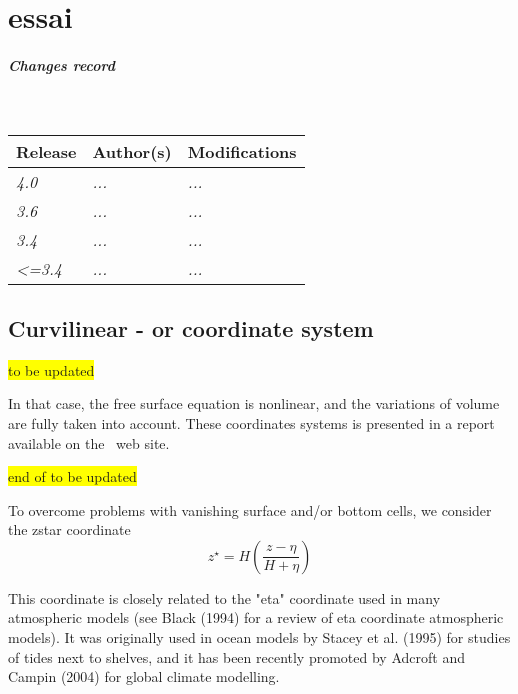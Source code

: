 \documentclass[../main/NEMO_manual]{subfiles}
\begin{document}
\chapter{ essai \zstar \sstar}

\thispagestyle{plain}

\chaptertoc

\paragraph{Changes record} ~\\

{\footnotesize
  \begin{tabularx}{\textwidth}{l||X|X}
    Release & Author(s) & Modifications \\
    \hline
    {\em   4.0} & {\em ...} & {\em ...} \\
    {\em   3.6} & {\em ...} & {\em ...} \\
    {\em   3.4} & {\em ...} & {\em ...} \\
    {\em <=3.4} & {\em ...} & {\em ...}
  \end{tabularx}
}

\clearpage

\section{Curvilinear \zstar- or \sstar coordinate system}

\colorbox{yellow}{ to be updated }

In that case, the free surface equation is nonlinear, and the variations of volume are fully taken into account.
These coordinates systems is presented in a report \citep{levier.treguier.ea_rpt07} available on the \NEMO\ web site.

\colorbox{yellow}{  end of to be updated}


To overcome problems with vanishing surface and/or bottom cells, we consider the zstar coordinate
\[
  z^\star = H \left( \frac{z-\eta}{H+\eta} \right)
\]

This coordinate is closely related to the "eta" coordinate used in many atmospheric models
(see Black (1994) for a review of eta coordinate atmospheric models).
It was originally used in ocean models by Stacey et al. (1995) for studies of tides next to shelves,
and it has been recently promoted by Adcroft and Campin (2004) for global climate modelling.
\end{document}
